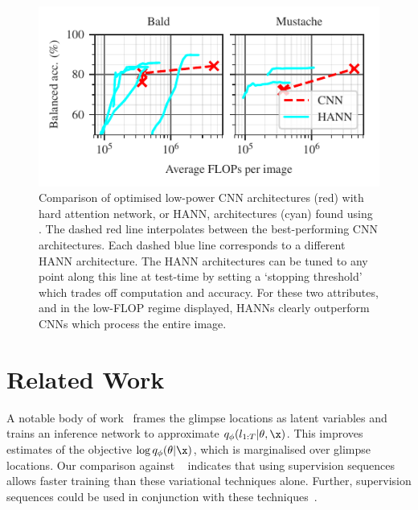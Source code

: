 \begin{figure}[t]
  \centering
  \vspace{-.1cm}
  \includegraphics[scale=1]{figs/nogs/acc-flops-comparison-some}
  \vspace{-.2cm}
  \caption{Comparison of optimised low-power CNN architectures (red) with hard
    attention network, or HANN, architectures (cyan) found using \PSNOGS{}. The
    dashed red line interpolates between the best-performing CNN architectures.
    Each dashed blue line corresponds to a different HANN architecture. The HANN
    architectures can be tuned to any point along this line at test-time by
    setting a `stopping threshold' which trades off computation and accuracy.
    For these two attributes, and in the low-FLOP regime displayed, HANNs
    clearly outperform CNNs which process the entire image.}
    \vspace{-.3cm}
  \label{fig:acc-flops}
\end{figure}

\section{Related Work} \label{sec:nogs-related-work}

 A notable body of
work~\cite{ba2015learning,lawson2018learning,shankar2018posterior} frames the
glimpse locations as latent variables and trains an inference network to
approximate $q_\phi (l_{1:T} | \theta, \x)$. This improves estimates of the
objective $\log q_\phi (\theta | \x)$, which is marginalised over glimpse
locations. Our comparison against \WSRAM{}~\cite{ba2015learning} indicates that
using supervision sequences allows faster training than these variational
techniques alone. Further, supervision sequences could be used in conjunction
with these techniques~\cite{teng2020semi}.

